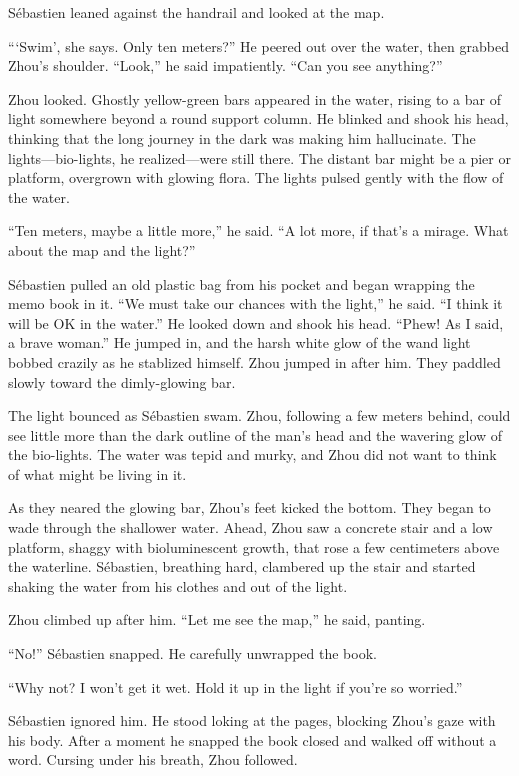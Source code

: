 \documentclass[10pt,a4paper]{article}
\begin{document}
S\'{e}bastien leaned against the handrail and looked at the map.

```Swim', she says. Only ten meters?'' He peered out over the
water, then grabbed Zhou's shoulder. ``Look,'' he said impatiently.
``Can you see anything?''

Zhou looked. Ghostly yellow-green bars appeared in the water,
rising to a bar of light somewhere beyond a round support column.
He blinked and shook his head, thinking that the long journey in
the dark was making him hallucinate. The lights---bio-lights, he
realized---were still there. The distant bar might be a pier or
platform, overgrown with glowing flora. The lights pulsed gently
with the flow of the water.

``Ten meters, maybe a little more,'' he said. ``A lot more, if that's
a mirage. What about the map and the light?''

S\'{e}bastien pulled an old plastic bag from his pocket and began
wrapping the memo book in it. ``We must take our chances with the
light,'' he said. ``I think it will be OK in the water.'' He looked
down and shook his head. ``Phew! As I said, a brave woman.'' He jumped
in, and the harsh white glow of the wand light bobbed crazily as he
stablized himself. Zhou jumped in after him. They paddled slowly
toward the dimly-glowing bar.

The light bounced as S\'{e}bastien swam. Zhou, following a few meters
behind, could see little more than the dark outline of the man's
head and the wavering glow of the bio-lights. The water was tepid and
murky, and Zhou did not want to think of what might be living in it.

As they neared the glowing bar, Zhou's feet kicked the bottom.
They began to wade through the shallower water. Ahead, Zhou saw
a concrete stair and a low platform, shaggy with bioluminescent
growth, that rose a few centimeters above the waterline. S\'{e}bastien,
breathing hard, clambered up the stair and started shaking the
water from his clothes and out of the light.

Zhou climbed up after him. ``Let me see the map,'' he said, panting.

``No!'' S\'{e}bastien snapped. He carefully unwrapped the book.

``Why not? I won't get it wet. Hold it up in the light if you're
so worried.''

S\'{e}bastien ignored him. He stood loking at the pages, blocking Zhou's
gaze with his body. After a moment he snapped the book closed and
walked off without a word. Cursing under his breath, Zhou followed.
\end{document}

